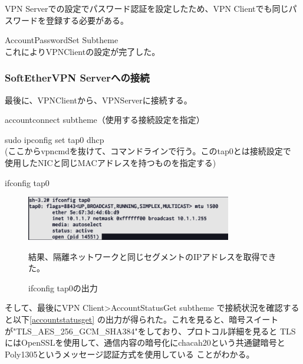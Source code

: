 \documentclass[11pt,a4j,titlepage]{jreport}
\begin{document}
VPN Serverでの設定でパスワード認証を設定したため、VPN Clientでも同じパスワードを登録する必要がある。
\begin{description}
    \setlength{\parskip}{0.0cm} %
    \setlength{\itemsep}{0.0cm} 
    \item[VPN Client\textgreater] AccountPasswordSet Subtheme\\ これによりVPNClientの設定が完了した。
\end{description}


\subsubsection*{SoftEtherVPN Serverへの接続}
最後に、VPNClientから、VPNServerに接続する。
\begin{description}
    \setlength{\parskip}{0.0cm} %
    \setlength{\itemsep}{0.0cm} 
    \item[VPN Client\textgreater] accountconnect subtheme（使用する接続設定を指定）\\ 
    \item[\$] sudo ipconfig set tap0 dhcp \\(ここからvpncmdを抜けて、コマンドラインで行う。このtap0とは接続設定で
    使用したNICと同じMACアドレスを持つものを指定する)
    \item[\$] ifconfig tap0 \\
    \begin{figure}[H]
        \centering
        \includegraphics*[width=0.8\textwidth,page=1]{graphs/dhcpsuccess.png}
        \caption{ifconfig tap0の出力}
        \label{tap0の出力}
        結果、隔離ネットワークと同じセグメントのIPアドレスを取得できた。
    \end{figure}

\end{description}
そして、最後にVPN Client\textgreater AccountStatusGet subtheme で接続状況を確認すると以下\ref{accountstatusget}
の出力が得られた。これを見ると、暗号スイートが"TLS\_AES\_256\_GCM\_SHA384"をしており、プロトコル詳細を見ると
TLSにはOpenSSLを使用して、通信内容の暗号化にchacah20という共通鍵暗号とPoly1305というメッセージ認証方式を使用している
ことがわかる。
\end{document}
